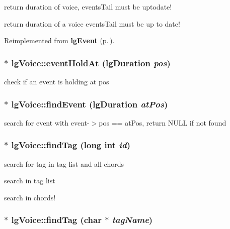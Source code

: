return duration of voice, events\-Tail must be uptodate! 

return duration of a voice events\-Tail must be up to date! 

Reimplemented from {\bf lg\-Event} {\rm (p.\,\pageref{classlgEvent_a2})}.
\subsubsection{$\ast$ lg\-Voice::event\-Hold\-At ({\bf lg\-Duration} {\em pos})}\label{classlgVoice_a25}


check if an event is holding at pos 

\subsubsection{ $\ast$ lg\-Voice::find\-Event ({\bf lg\-Duration} {\em at\-Pos})\hspace{0.3cm}{\tt  [virtual]}}\label{classlgVoice_a24}


search for event with event-$>$pos == at\-Pos, return NULL if not found 

\subsubsection{ $\ast$ lg\-Voice::find\-Tag (long int {\em id})\hspace{0.3cm}{\tt  [virtual]}}\label{classlgVoice_a23}


search for tag in tag list and all chords 

search in tag list

search in chords! 
\subsubsection{ $\ast$ lg\-Voice::find\-Tag (char $\ast$ {\em tag\-Name})\hspace{0.3cm}{\tt  [virtual]}}\label{classlgVoice_a2}


